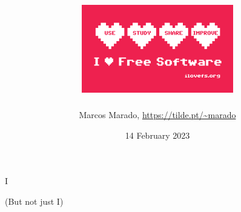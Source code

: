 \documentclass[landscape]{slides}
\author{Marcos Marado, \url{https://tilde.pt/~marado}}
\title{\includegraphics{ilovefs-sticker_thumb.png}}
\date{14 February 2023}
\begin{document}

\begin{slide}
\maketitle
\end{slide}


\begin{slide}
I

\end{slide}

\begin{slide}
(But not just I)

\end{slide}
\end{document}
